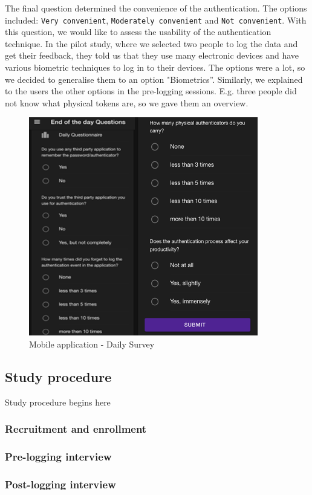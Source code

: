 The final question determined the convenience of the authentication. The options included: \texttt{Very convenient}, \texttt{Moderately convenient} and \texttt{Not convenient}. With this question, we would like to assess the usability of the authentication technique. In the pilot study, where we selected two people to log the data and get their feedback, they told us that they use many electronic devices and have various biometric techniques to log in to their devices. The options were a lot, so we decided to generalise them to an option "Biometrics''. Similarly, we explained to the users the other options in the pre-logging sessions. E.g. three people did not know what physical tokens are, so we gave them an overview. 
\begin{figure}
\begin{center}
  \includegraphics[scale=0.5]{images/eod-survey.png}
\end{center}
\caption{\label{fig:app-daily-survey} Mobile application - Daily Survey}
\end{figure}
\subsection{Study procedure}
Study procedure begins here
\subsubsection{Recruitment and enrollment}
\subsubsection{Pre-logging interview}
\subsubsection{Post-logging interview}

